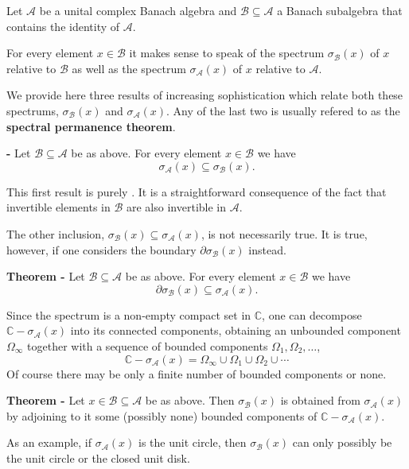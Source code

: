 \documentclass[12pt]{article}
\begin{document}
Let $\mathcal{A}$ be a unital complex Banach algebra and $\mathcal{B} \subseteq \mathcal{A}$ a Banach subalgebra that contains the identity of $\mathcal{A}$.

For every element $x \in \mathcal{B}$ it makes sense to speak of the spectrum $\sigma_{\mathcal{B}}(x)$ of $x$ relative to  $\mathcal{B}$ as well as the spectrum $\sigma_{\mathcal{A}}(x)$ of $x$ relative to $\mathcal{A}$.

We provide here three results of increasing sophistication which relate both these spectrums, $\sigma_{\mathcal{B}}(x)$ and $\sigma_{\mathcal{A}}(x)$. Any of the last two is usually refered to as the {\bf spectral permanence theorem}.

{\bf {} -} Let $\mathcal{B} \subseteq \mathcal{A}$ be as above. For every element $x \in \mathcal{B}$ we have
\begin{displaymath}
\sigma_{\mathcal{A}}(x) \subseteq \sigma_{\mathcal{B}}(x).
\end{displaymath}

This first result is purely . It is a straightforward consequence of the fact that invertible elements in $\mathcal{B}$ are also invertible in $\mathcal{A}$.

The other inclusion, $\sigma_{\mathcal{B}}(x) \subseteq \sigma_{\mathcal{A}}(x)$, is not necessarily true. It is true, however, if one considers the boundary $\partial \sigma_{\mathcal{B}}(x)$ instead.

{\bf Theorem -} Let $\mathcal{B} \subseteq \mathcal{A}$ be as above. For every element $x \in \mathcal{B}$ we have
\begin{displaymath}
\partial \sigma_{\mathcal{B}}(x) \subseteq \sigma_{\mathcal{A}}(x).
\end{displaymath}

Since the spectrum is a non-empty compact set in $\mathbb{C}$, one can decompose $\mathbb{C} - \sigma_{\mathcal{A}}(x)$ into its connected components, obtaining an unbounded component $\Omega_{\infty}$ together with a sequence of bounded components $\Omega_1, \Omega_2, \dots$,
\begin{displaymath}
\mathbb{C}-\sigma_{\mathcal{A}}(x) = \Omega_{\infty} \cup \Omega_{1} \cup \Omega_{2} \cup \cdots
\end{displaymath}
Of course there may be only a finite number of bounded components or  none.

{\bf Theorem -} Let $ x \in \mathcal{B} \subseteq \mathcal{A}$ be as above. Then $\sigma_{\mathcal{B}}(x)$ is obtained from $\sigma_{\mathcal{A}}(x)$ by adjoining to it some (possibly none) bounded components of $\mathbb{C}-\sigma_{\mathcal{A}}(x)$.

As an example, if $\sigma_{\mathcal{A}}(x)$ is the unit circle, then $\sigma_{\mathcal{B}}(x)$ can only possibly be the unit circle or the closed unit disk.
\end{document}

